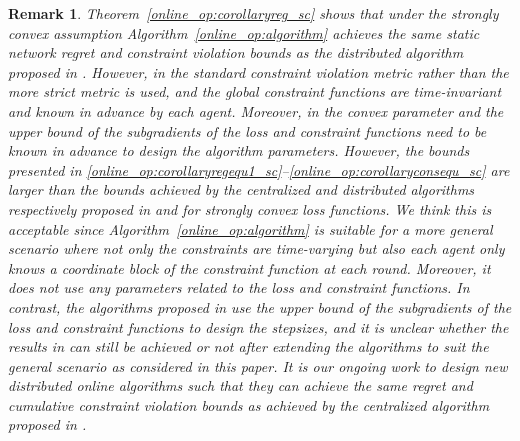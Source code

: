 \documentclass[12pt,draftcls,onecolumn]{IEEEtran}%
\newtheorem{remark}{Remark}
\begin{document}
\begin{remark}\label{online_op:remark_sc}
	Theorem~\ref{online_op:corollaryreg_sc} shows that under the strongly convex assumption Algorithm~\ref{online_op:algorithm} achieves the same static network regret and constraint violation bounds as the distributed algorithm proposed in \cite{yuan2017adaptive}. However, in \cite{yuan2017adaptive} the standard constraint violation metric rather than the more strict metric is used, and the global constraint functions are time-invariant and known in advance by each agent. Moreover, in \cite{yuan2017adaptive} the convex parameter and the upper bound of the subgradients of the loss and constraint functions need to be known in advance to design the algorithm parameters. However, the bounds presented in \eqref{online_op:corollaryregequ1_sc}--\eqref{online_op:corollaryconsequ_sc} are larger than the bounds achieved by the centralized and distributed algorithms respectively proposed in \cite{NIPS2018_7852} and \cite{yuan2021distributedb} for strongly convex loss functions. We think this is acceptable since Algorithm~\ref{online_op:algorithm} is suitable for a more general scenario where not only the constraints are time-varying but also each agent only knows a coordinate block of the constraint function at each round. Moreover, it does not use any parameters related to the loss and constraint functions. In contrast, the algorithms proposed in \cite{NIPS2018_7852,yuan2021distributedb} use the upper bound of the subgradients of the loss and constraint functions to design the stepsizes, and it is unclear whether the results in \cite{NIPS2018_7852,yuan2021distributedb} can still be achieved or not after extending the algorithms to suit the general scenario as considered in this paper.
	It is our ongoing work to design new distributed online algorithms such that they can achieve the same regret and cumulative constraint violation bounds as achieved by the centralized algorithm proposed in \cite{NIPS2018_7852}.
\end{remark}
\end{document}
